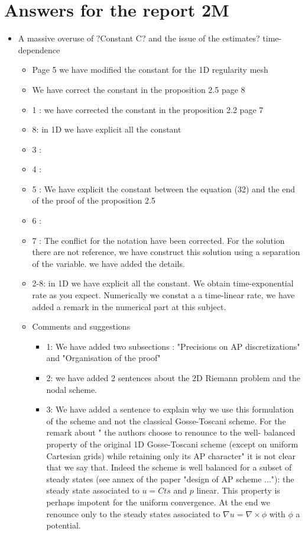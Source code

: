 \documentclass[a4paper,french,english,10pt]{article}
\begin{document}
\section{Answers for the report 2M}
\begin{itemize}
\item A massive overuse of ?Constant C? and the issue of the estimates? time-dependence
\begin{itemize}
\item Page 5 we have modified the constant for the 1D regularity mesh
\item We have correct the constant in the proposition 2.5 page 8
\item 1 : we have corrected the constant in the proposition 2.2 page 7
\item 8: in 1D we have explicit all the constant 
\item 3 :
\item 4 :
\item 5 : We have explicit the constant between the equation (32) and the end of the proof of the proposition 2.5
\item 6 :
\item 7 : The conflict for the notation have been corrected. For the solution there are not reference, we have construct this solution using a separation of the variable. we have added the details.
\item 2-8: in 1D we have explicit all the constant. We obtain time-exponential rate as you expect. Numerically we constat a a time-linear rate, we have added a remark in the numerical part at this subject. 
\end{itemize}
\begin{itemize}
\item Comments and suggestions
\begin{itemize}
\item 1: We have added two subsections : "Precisions on AP discretizations" and "Organisation of the proof"
\item 2: we have added 2 sentences about the 2D Riemann problem and the nodal scheme. 
\item 3: We have added a sentence to explain why we use this formulation of the scheme and not the classical Gosse-Toscani scheme. For the remark about " the authors choose to renounce to the well- balanced property of the original 1D Gosse-Toscani scheme (except on uniform Cartesian grids) while retaining only its AP character" it is not clear that we say that. Indeed the scheme is well balanced for a subset of steady states (see annex of the paper "design of AP scheme ..."): the steady state associated to $u=Cts$ and $p$ linear. This property is perhaps impotent for the uniform convergence. At the end we renounce only to the steady states associated to $\nabla{u}=\nabla\times \phi$ with $\phi$ a potential. 

\end{itemize}
\end{itemize}
\end{itemize}
\end{document}
